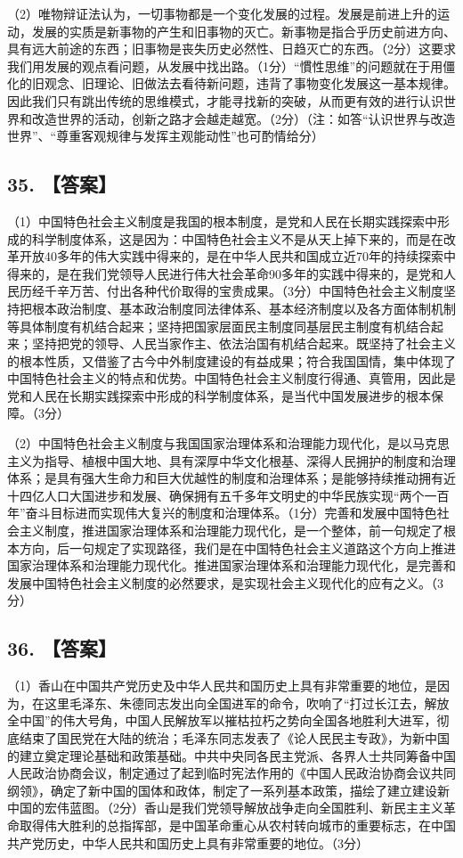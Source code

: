 \documentclass[UTF8,11pt]{ctexart}
\begin{document}
（2）唯物辩证法认为，一切事物都是一个变化发展的过程。发展是前进上升的运动，发展的实质是新事物的产生和旧事物的灭亡。新事物是指合乎历史前进方向、具有远大前途的东西；旧事物是丧失历史必然性、日趋灭亡的东西。（2分）这要求我们用发展的观点看问题，从发展中找出路。（1分）“慣性思维”的问题就在于用僵化的旧观念、旧理论、旧做法去看待新问题，违背了事物变化发展这一基本规律。因此我们只有跳出传统的思维模式，才能寻找新的突破，从而更有效的进行认识世界和改造世界的活动，创新之路才会越走越宽。（2分）（注：如答“认识世界与改造世界”、“尊重客观规律与发挥主观能动性”也可酌情给分）


\subsection*{35. 【答案】}

（1）中国特色社会主义制度是我国的根本制度，是党和人民在长期实践探索中形成的科学制度体系，这是因为：中国特色社会主义不是从天上掉下来的，而是在改革开放40多年的伟大实践中得来的，是在中华人民共和国成立近70年的持续探索中得来的，是在我们党领导人民进行伟大社会革命90多年的实践中得来的，是党和人民历经千辛万苦、付出各种代价取得的宝贵成果。（3分）中国特色社会主义制度坚持把根本政治制度、基本政治制度同法律体系、基本经济制度以及各方面体制机制等具体制度有机结合起来；坚持把国家层面民主制度同基层民主制度有机结合起来；坚持把党的领导、人民当家作主、依法治国有机结合起来。既坚持了社会主义的根本性质，又借鉴了古今中外制度建设的有益成果；符合我国国情，集中体现了中国特色社会主义的特点和优势。中国特色社会主义制度行得通、真管用，因此是党和人民在长期实践探索中形成的科学制度体系，是当代中国发展进步的根本保障。（3分）


（2）中国特色社会主义制度与我国国家治理体系和治理能力现代化，是以马克思主义为指导、植根中国大地、具有深厚中华文化根基、深得人民拥护的制度和治理体系；是具有强大生命力和巨大优越性的制度和治理体系；是能够持续推动拥有近十四亿人口大国进步和发展、确保拥有五千多年文明史的中华民族实现“两个一百年”奋斗目标进而实现伟大复兴的制度和治理体系。（1分）完善和发展中国特色社会主义制度，推进国家治理体系和治理能力现代化，是一个整体，前一句规定了根本方向，后一句规定了实现路径，我们是在中国特色社会主义道路这个方向上推进国家治理体系和治理能力现代化。推进国家治理体系和治理能力现代化，是完善和发展中国特色社会主义制度的必然要求，是实现社会主义现代化的应有之义。（3分）


\subsection*{36. 【答案】}

（1）香山在中国共产党历史及中华人民共和国历史上具有非常重要的地位，是因为，在这里毛泽东、朱德同志发出向全国进军的命令，吹响了“打过长江去，解放全中国”的伟大号角，中国人民解放军以摧枯拉朽之势向全国各地胜利大进军，彻底结束了国民党在大陆的统治；毛泽东同志发表了《论人民民主专政》，为新中国的建立奠定理论基础和政策基础。中共中央同各民主党派、各界人士共同筹备中国人民政治协商会议，制定通过了起到临时宪法作用的《中国人民政治协商会议共同纲领》，确定了新中国的国体和政体，制定了一系列基本政策，描绘了建立建设新中国的宏伟蓝图。（2分）香山是我们党领导解放战争走向全国胜利、新民主主义革命取得伟大胜利的总指挥部，是中国革命重心从农村转向城市的重要标志，在中国共产党历史，中华人民共和国历史上具有非常重要的地位。（3分）
\end{document}
